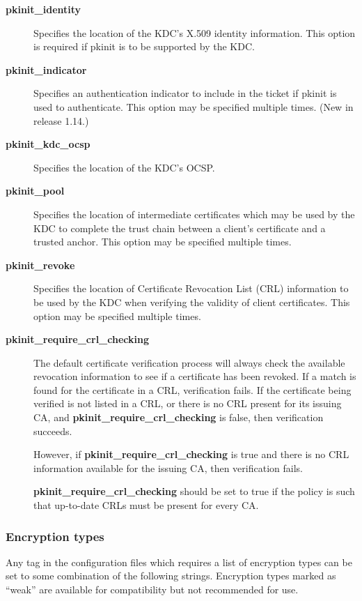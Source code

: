 \documentclass[letterpaper,10pt,english]{sphinxmanual}
\begin{document}
\begin{description}
\begin{description}
\end{description}

\item[{\textbf{pkinit\_identity}}] \leavevmode
Specifies the location of the KDC's X.509 identity information.
This option is required if pkinit is to be supported by the KDC.

\item[{\textbf{pkinit\_indicator}}] \leavevmode
Specifies an authentication indicator to include in the ticket if
pkinit is used to authenticate.  This option may be specified
multiple times.  (New in release 1.14.)

\item[{\textbf{pkinit\_kdc\_ocsp}}] \leavevmode
Specifies the location of the KDC's OCSP.

\item[{\textbf{pkinit\_pool}}] \leavevmode
Specifies the location of intermediate certificates which may be
used by the KDC to complete the trust chain between a client's
certificate and a trusted anchor.  This option may be specified
multiple times.

\item[{\textbf{pkinit\_revoke}}] \leavevmode
Specifies the location of Certificate Revocation List (CRL)
information to be used by the KDC when verifying the validity of
client certificates.  This option may be specified multiple times.

\item[{\textbf{pkinit\_require\_crl\_checking}}] \leavevmode
The default certificate verification process will always check the
available revocation information to see if a certificate has been
revoked.  If a match is found for the certificate in a CRL,
verification fails.  If the certificate being verified is not
listed in a CRL, or there is no CRL present for its issuing CA,
and \textbf{pkinit\_require\_crl\_checking} is false, then verification
succeeds.

However, if \textbf{pkinit\_require\_crl\_checking} is true and there is
no CRL information available for the issuing CA, then verification
fails.

\textbf{pkinit\_require\_crl\_checking} should be set to true if the
policy is such that up-to-date CRLs must be present for every CA.

\end{description}


\subsubsection{Encryption types}
\label{admin/conf_files/kdc_conf:id6}\label{admin/conf_files/kdc_conf:encryption-types}
Any tag in the configuration files which requires a list of encryption
types can be set to some combination of the following strings.
Encryption types marked as ``weak'' are available for compatibility but
not recommended for use.
\end{document}
